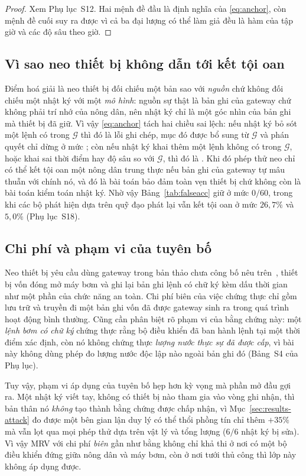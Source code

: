 \begin{proof}
Xem Phụ lục~S12. Hai mệnh đề đầu là định nghĩa của \eqref{eq:anchor}, còn mệnh đề
cuối suy ra được vì cả ba đại lượng có thể làm giả đều là hàm của tập giờ và các
độ sâu theo giờ.
\end{proof}

\subsection{Vì sao neo thiết bị không dẫn tới kết tội oan}

Điểm hoá giải là neo thiết bị đối chiếu một bản sao với \emph{nguồn} chứ không đối chiếu
một nhật ký với một \emph{mô hình}: nguồn sự thật là bản ghi của gateway chứ không phải
trí nhớ của nông dân, nên nhật ký chỉ là một góc nhìn của bản ghi mà thiết bị đã giữ. Vì
vậy \eqref{eq:anchor} tách hai chiều sai lệch: nếu nhật ký bỏ sót một lệnh có trong
$\mathcal{G}$ thì đó là lỗi ghi chép, mục đó được bổ sung từ $\mathcal{G}$ và phán quyết
chỉ dừng ở mức ; còn nếu nhật ký khai thêm một lệnh không có trong
$\mathcal{G}$, hoặc khai sai thời điểm hay độ sâu so với $\mathcal{G}$, thì đó là
. Khi đó phép thử neo chỉ có thể kết tội oan một nông dân trung thực nếu bản ghi
của gateway tự mâu thuẫn với chính nó, và đó là bài toán bảo đảm toàn vẹn thiết bị chứ
không còn là bài toán kiểm toán nhật ký. Nhờ vậy Bảng~\ref{tab:falseacc} giữ ở mức
$0/60$, trong khi các bộ phát hiện dựa trên quỹ đạo phát lại vẫn kết tội oan ở mức
$26{,}7\%$ và $5{,}0\%$ (Phụ lục~S18).

\subsection{Chi phí và phạm vi của tuyên bố}

Neo thiết bị yêu cầu dùng gateway trong bản thảo chưa công bố nêu trên~\cite{twingate2026}, thiết bị vốn đóng mở máy bơm và ghi lại bản ghi lệnh có chữ ký kèm dấu thời gian
như một phần của chức năng an toàn. Chi phí biên của việc chứng thực chỉ gồm lưu trữ và truyền đi một bản ghi vốn đã được gateway sinh ra trong quá trình hoạt động bình thường. Cũng cần phân biệt rõ phạm vi của bằng chứng này: một \emph{lệnh bơm có chữ ký} chứng thực rằng bộ điều khiển đã ban hành lệnh tại một thời điểm xác định, còn nó không chứng thực \emph{lượng nước thực sự đã được cấp}, vì bài này không dùng phép đo lượng nước độc lập nào ngoài bản ghi đó (Bảng~S4 của Phụ lục).

Tuy vậy, phạm vi áp dụng của tuyên bố hẹp hơn kỳ vọng mà phần mở đầu gợi ra. Một nhật ký viết tay, không có thiết bị nào tham gia vào vòng ghi nhận, thì bản
thân nó \emph{không} tạo thành bằng chứng được chấp nhận, vì
Mục~\ref{sec:results-attack} đo được một bên gian lận duy lý có thể thổi phồng tín chỉ
thêm $+35\%$ mà vẫn lọt qua mọi phép thử dựa trên vật lý và tổng lượng ($6/6$
nhật ký bị sửa). Vì vậy MRV với chi phí \emph{biên} gần như bằng không chỉ
khả thi ở nơi có một bộ điều khiển đứng giữa nông dân và máy bơm, còn ở nơi tưới
thủ công thì lớp này không áp dụng được.
